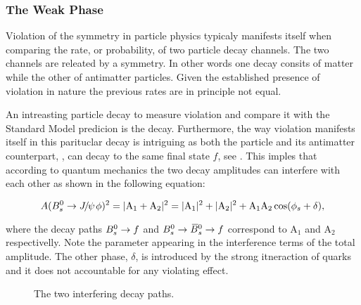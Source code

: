 

\subsubsection{The Weak Phase \phis}
Violation of the \CP symmetry in particle physics typicaly manifests itself when comparing
the rate, or probability, of two particle decay channels. The two channels are releated by
a \CP symmetry. In other words one decay consits of matter while the other of antimatter particles.
Given the established presence of \CP violation in nature the previous rates are in principle not equal.

An intreasting particle decay to measure \CP violation and compare it with the Standard Model
predicion is the \BsJpsiPhi decay.
Furthermore, the way \CP violation manifests itself in this parituclar decay is intriguing
as both the \Bs particle and its antimatter counterpart, \Bsb, can decay to the same final state $f$,
see . This imples that according to quantum mechanics the two decay
amplitudes can interfere with each other as shown in the following equation:

\newcommand{\aOne}{\ensuremath{ \mathrm{A_1}}\xspace}
\newcommand{\aTwo}{\ensuremath{ \mathrm{A_2}}\xspace}
\begin{equation}
  \centering
A(\BsJpsiPhi)^2 = |\aOne + \aTwo|^2 = |\aOne|^2 + |\aTwo|^2 + \aOne\aTwo\cos(\phis + \delta),
  \label{app_interf_amp}
\end{equation}

\noindent where the decay paths $B^0_s\rightarrow f$ and $B^0_s \rightarrow \kern 0.18em\overline{\kern -0.18em B}{}^0_s \rightarrow f$ correspond to \aOne and \aTwo
respectivelly. Note the \phis parameter appearing in the interference terms of the total amplitude.
The other phase, $\delta$, is introduced by the strong itneraction of quarks and it does not
accountable for any \CP violating effect.

\begin{figure}[h]
  \centering
  \resizebox{0.4\textwidth}{!}{}
  \caption{The two interfering decay paths.}
  \label{app_interference}
\end{figure}

